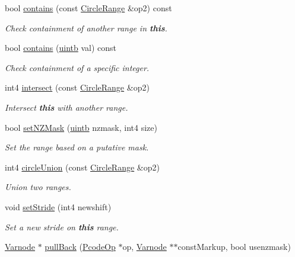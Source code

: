 \begin{DoxyCompactItemize}
bool \mbox{\hyperlink{class_circle_range_a9973f2c914dcfe8760079aaa0459d758}{contains}} (const \mbox{\hyperlink{class_circle_range}{Circle\+Range}} \&op2) const
\begin{DoxyCompactList}\small\item\em Check containment of another range in {\bfseries{this}}. \end{DoxyCompactList}\item 
bool \mbox{\hyperlink{class_circle_range_a4681b55d158417a6598dd09c08850848}{contains}} (\mbox{\hyperlink{types_8h_a2db313c5d32a12b01d26ac9b3bca178f}{uintb}} val) const
\begin{DoxyCompactList}\small\item\em Check containment of a specific integer. \end{DoxyCompactList}\item 
int4 \mbox{\hyperlink{class_circle_range_a9d8c4b0c9c8e9d51baa6eb2cbb551c6d}{intersect}} (const \mbox{\hyperlink{class_circle_range}{Circle\+Range}} \&op2)
\begin{DoxyCompactList}\small\item\em Intersect {\bfseries{this}} with another range. \end{DoxyCompactList}\item 
bool \mbox{\hyperlink{class_circle_range_a82f38601c64d4bdcc4aa977c2896b0f4}{set\+N\+Z\+Mask}} (\mbox{\hyperlink{types_8h_a2db313c5d32a12b01d26ac9b3bca178f}{uintb}} nzmask, int4 size)
\begin{DoxyCompactList}\small\item\em Set the range based on a putative mask. \end{DoxyCompactList}\item 
int4 \mbox{\hyperlink{class_circle_range_a286db51910f20ec7624132f8298cfe9b}{circle\+Union}} (const \mbox{\hyperlink{class_circle_range}{Circle\+Range}} \&op2)
\begin{DoxyCompactList}\small\item\em Union two ranges. \end{DoxyCompactList}\item 
void \mbox{\hyperlink{class_circle_range_a44fa8dca988417e0381e891268713a03}{set\+Stride}} (int4 newshift)
\begin{DoxyCompactList}\small\item\em Set a new stride on {\bfseries{this}} range. \end{DoxyCompactList}\item 
\mbox{\hyperlink{class_varnode}{Varnode}} $\ast$ \mbox{\hyperlink{class_circle_range_a8b2b3063264a1169940c7131628b9a4b}{pull\+Back}} (\mbox{\hyperlink{class_pcode_op}{Pcode\+Op}} $\ast$op, \mbox{\hyperlink{class_varnode}{Varnode}} $\ast$$\ast$const\+Markup, bool usenzmask)
$$
\end{DoxyCompactItemize}
